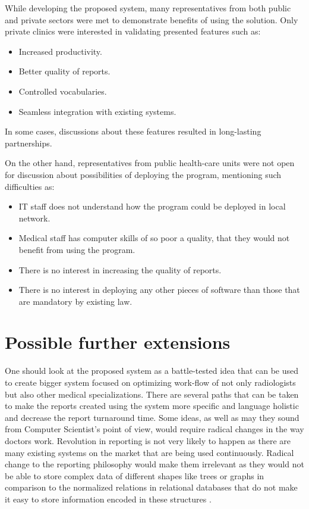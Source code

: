 \documentclass[12pt, twoside, openany]{report}
\theoremstyle{definition}
\begin{document}
While developing the proposed system, many representatives from both public and private sectors were met to demonstrate benefits of using the solution. Only private clinics were interested in validating presented features such as:
\begin{itemize}
\item Increased productivity.
\item Better quality of reports.
\item Controlled vocabularies.
\item Seamless integration with existing systems.
\end{itemize}
In some cases, discussions about these features resulted in long-lasting partnerships.

On the other hand, representatives from public health-care units were not open for discussion about possibilities of deploying the program, mentioning such difficulties as:
\begin{itemize}
\item IT staff does not understand how the program could be deployed in local network.
\item Medical staff has computer skills of so poor a quality, that they would not benefit from using the program.
\item There is no interest in increasing the quality of reports.
\item There is no interest in deploying any other pieces of software than those that are mandatory by existing law.
\end{itemize}



\section{Possible further extensions}
One should look at the proposed system as a battle-tested idea that can be used to create bigger system focused on optimizing work-flow of not only radiologists but also other medical specializations. There are several paths that can be taken to make the reports created using the system more specific and language holistic and decrease the report turnaround time. Some ideas, as well as may they sound from Computer Scientist's point of view, would require radical changes in the way doctors work. Revolution in reporting is not very likely to happen as there are many existing systems on the market that are being used continuously. Radical change to the reporting philosophy would make them irrelevant as they would not be able to store complex data of different shapes like trees or graphs in comparison to the normalized relations in relational databases that do not make it easy to store information encoded in these structures \cite{coelko-trees}. 
\end{document}

